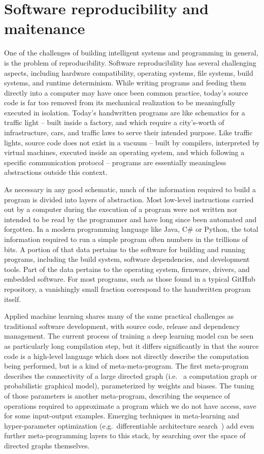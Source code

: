 \documentclass[12pt,initial,twoside,maitrise]{dms}
\numberwithin{equation}{section}
\numberwithin{table}{chapter}
\numberwithin{figure}{chapter}
\begin{document}
\section{Software reproducibility and maitenance}

One of the challenges of building intelligent systems and programming in general, is the problem of reproducibility. Software reproducibility has several challenging aspects, including hardware compatibility, operating systems, file systems, build systems, and runtime determinism. While writing programs and feeding them directly into a computer may have once been common practice, today's source code is far too removed from its mechanical realization to be meaningfully executed in isolation. Today's handwritten programs are like schematics for a traffic light -- built inside a factory, and which require a city's-worth of infrastructure, cars, and traffic laws to serve their intended purpose. Like traffic lights, source code does not exist in a vacuum -- built by compilers, interpreted by virtual machines, executed inside an operating system, and which following a specific communication protocol -- programs are essentially meaningless abstractions outside this context.

As necessary in any good schematic, much of the information required to build a program is divided into layers of abstraction. Most low-level instructions carried out by a computer during the execution of a program were not written nor intended to be read by the programmer and have long since been automated and forgotten. In a modern programming language like Java, C\# or Python, the total information required to run a simple program often numbers in the trillions of bits. A portion of that data pertains to the software for building and running programs, including the build system, software dependencies, and development tools. Part of the data pertains to the operating system, firmware, drivers, and embedded software. For most programs, such as those found in a typical GitHub repository, a vanishingly small fraction correspond to the handwritten program itself.

Applied machine learning shares many of the same practical challenges as traditional software development, with source code, release and dependency management. The current process of training a deep learning model can be seen as particularly long compilation step, but it differs significantly in that the source code is a high-level language which does not directly describe the computation being performed, but is a kind of meta-meta-program. The first meta-program describes the connectivity of a large directed graph (i.e.~ a computation graph or probabilistic graphical model), parameterized by weights and biases. The tuning of those parameters is another meta-program, describing the sequence of operations required to approximate a program which we do not have access, save for some input-output examples. Emerging techniques in meta-learning and hyper-parameter optimization (e.g.~differentiable architecture search~\citep{liu2018darts}) add even further meta-programming layers to this stack, by searching over the space of directed graphs themselves.
\end{document}
